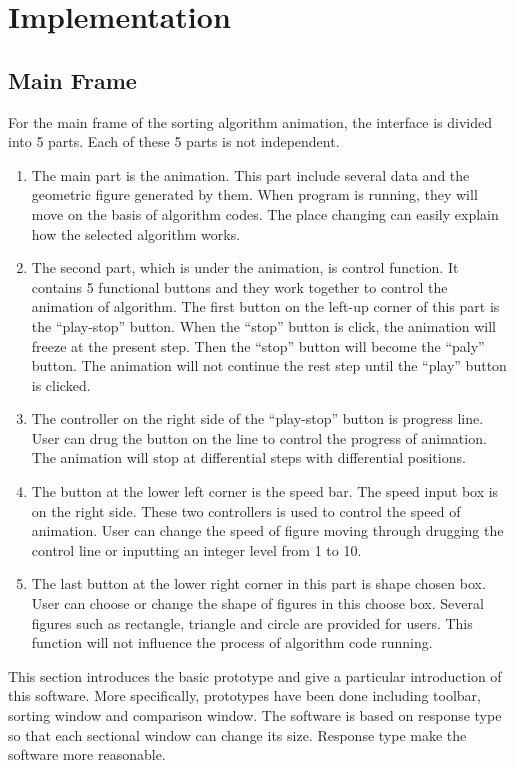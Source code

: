 \documentclass[paper=a4, fontsize=11pt,twoside]{scrartcl}		%
\begin{document}
\section{Implementation}
\subsection{Main Frame}
For the main frame of the sorting algorithm animation, the interface is divided into 5 parts. Each of these 5 parts is not independent. 
\begin{enumerate}
   \item The main part is the animation. This part include several data and the geometric figure generated by them. When program is running, they will move on the basis of algorithm codes. The place changing can easily explain how the selected algorithm works. 
   \item The second part, which is under the animation, is control function. It contains 5 functional buttons and they work together to control the animation of algorithm. The first button on the left-up corner of this part is the “play-stop” button. When the “stop” button is click, the animation will freeze at the present step. Then the “stop” button will become the “paly” button. The animation will not continue the rest step until the “play” button is clicked. 
   \item The controller on the right side of the “play-stop” button is progress line. User can drug the button on the line to control the progress of animation. The animation will stop at differential steps with differential positions. 
   \item The button at the lower left corner is the speed bar. The speed input box is on the right side. These two controllers is used to control the speed of animation. User can change the speed of figure moving through drugging the control line or inputting an integer level from 1 to 10. 
   \item The last button at the lower right corner in this part is shape chosen box. User can choose or change the shape of figures in this choose box. Several figures such as rectangle, triangle and circle are provided for users. This function will not influence the process of algorithm code running. 

\end{enumerate}


This section introduces the basic prototype and give a particular introduction of this software. More specifically, prototypes have been done including toolbar, sorting window and comparison window. The software is based on response type so that each sectional window can change its size. Response type make the software more reasonable.
\end{document}
